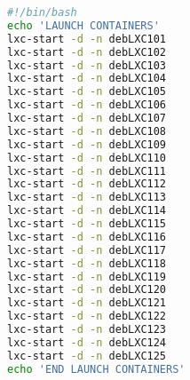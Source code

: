 \documentclass[french]{article}
\begin{document}
\begin{lstlisting}[language=bash,caption={}]
#!/bin/bash
echo 'LAUNCH CONTAINERS'
lxc-start -d -n debLXC101 
lxc-start -d -n debLXC102 
lxc-start -d -n debLXC103 
lxc-start -d -n debLXC104 
lxc-start -d -n debLXC105 
lxc-start -d -n debLXC106 
lxc-start -d -n debLXC107 
lxc-start -d -n debLXC108 
lxc-start -d -n debLXC109 
lxc-start -d -n debLXC110 
lxc-start -d -n debLXC111 
lxc-start -d -n debLXC112 
lxc-start -d -n debLXC113 
lxc-start -d -n debLXC114 
lxc-start -d -n debLXC115 
lxc-start -d -n debLXC116 
lxc-start -d -n debLXC117 
lxc-start -d -n debLXC118 
lxc-start -d -n debLXC119 
lxc-start -d -n debLXC120 
lxc-start -d -n debLXC121 
lxc-start -d -n debLXC122 
lxc-start -d -n debLXC123 
lxc-start -d -n debLXC124 
lxc-start -d -n debLXC125 
echo 'END LAUNCH CONTAINERS'
\end{lstlisting}
\end{document}

